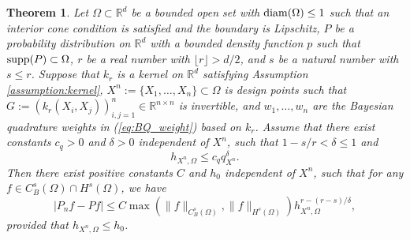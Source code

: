 \documentclass[11pt]{article}
\newtheorem{theorem}{Theorem}
\theoremstyle{remark}
\theoremstyle{example}
\theoremstyle{remark}
\newcommand{\R}{\mathbb{R}}
\begin{document}
\begin{theorem} \label{theo:BQ_misspecified}
Let $\Omega \subset \R^d$ be a bounded open set with ${\rm diam}(\Omega) \leq 1$ such that an interior cone condition is satisfied and the boundary is Lipschitz, $P$ be a probability distribution on $\R^d$ with a bounded density function $p$ such that ${\rm supp}(P) \subset \Omega$, $r$ be a real number with $\lfloor r \rfloor > d/2$, and $s$ be a natural number with $s \leq r$.
Suppose that $k_r$ is a kernel on $\R^d$ satisfying Assumption \ref{assumption:kernel},  $X^n := \{X_1,\dots,X_n\} \subset \Omega$ is design points such that $G := (k_r(X_i,X_j))_{i,j=1}^n \in \R^{n \times n}$ is invertible, and $w_1,\dots,w_n$ are the Bayesian quadrature weights in (\ref{eq:BQ_weight}) based on $k_r$. 
Assume that there exist constants $c_q > 0$ and $\delta > 0$ independent of $X^n$, such that $1- s/r < \delta \leq 1$ and 
\begin{equation} \label{eq:BQ_bound_cond_31}
h_{X^n,\Omega} \leq c_q q_{X^n}^\delta.
\end{equation} 
Then there exist positive constants $C$ and $h_0$ independent of $X^n$, such that for any $f \in C_B^s (\Omega) \cap H^s (\Omega)$, we have
\begin{equation} \label{eq:Bq_rate_sepa}
\left| P_n f - Pf \right| \leq C  \max \left(  \| f \|_{C_B^s(\Omega)}, \| f \|_{H^s(\Omega)}  \right)  h_{X^n,\Omega}^{r - (r-s)/\delta},
\end{equation}
provided that $h_{X^n,\Omega} \leq h_0$.%
\end{theorem}
%
\end{document}
